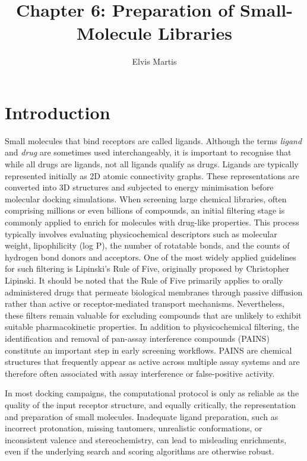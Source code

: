 \documentclass[12pt]{article}
\title{Chapter 6: Preparation of Small-Molecule Libraries}
\author{Elvis Martis}
\begin{document}
\maketitle

\section{Introduction}

Small molecules that bind receptors are called ligands. Although the terms \emph{ligand} and \emph{drug} are sometimes used interchangeably, it is important to recognise that while all drugs are ligands, not all ligands qualify as drugs. Ligands are typically represented initially as 2D atomic connectivity graphs. These representations are converted into 3D structures and subjected to energy minimisation before molecular docking simulations. When screening large chemical libraries, often comprising millions or even billions of compounds, an initial filtering stage is commonly applied to enrich for molecules with drug-like properties. This process typically involves evaluating physicochemical descriptors such as molecular weight, lipophilicity (log P), the number of rotatable bonds, and the counts of hydrogen bond donors and acceptors. One of the most widely applied guidelines for such filtering is Lipinski’s Rule of Five, originally proposed by Christopher Lipinski\cite{CH6_lipinski1997}. It should be noted that the Rule of Five primarily applies to orally administered drugs that permeate biological membranes through passive diffusion rather than active or receptor-mediated transport mechanisms.
Nevertheless, these filters remain valuable for excluding compounds that are unlikely to exhibit suitable pharmacokinetic properties. In addition to physicochemical filtering, the identification and removal of pan-assay interference compounds (PAINS)\cite{CH6_baell2010} constitute an important step in early screening workflows. PAINS are chemical structures that frequently appear as active across multiple assay systems and are therefore often associated with assay interference or false-positive activity. 

In most docking campaigns, the computational protocol is only as reliable as the quality of the input receptor structure, and equally critically, the representation and preparation of small molecules. Inadequate ligand preparation, such as incorrect protonation, missing tautomers, unrealistic conformations, or inconsistent valence and stereochemistry, can lead to misleading enrichments, even if the underlying search and scoring algorithms are otherwise robust.\cite{CH6_Sastry2013,CH6_kolb2009,CH6_KeyTopicsDocking} 
\end{document}
